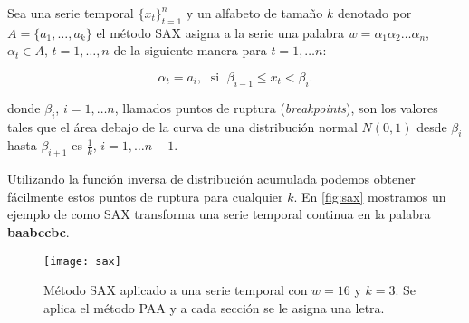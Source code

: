 \begin{definicion}[SAX]
  Sea una serie temporal $\{x_t\}_{t = 1}^n$ y un alfabeto de tamaño $k$ denotado por $A = \{a_1, \ldots, a_k\}$ el método SAX asigna a la serie una palabra $w = \alpha_1\alpha_2\ldots\alpha_n$, $\alpha_t \in A, \, t = 1, \ldots, n$ de la siguiente manera para $t = 1, \ldots n$:

  $$\alpha_t = a_i, \; \text{ si } \; \beta_{i-1} \leq x_t < \beta_i.$$

  donde $\beta_i$, $i = 1, \ldots n$, llamados puntos de ruptura (\emph{breakpoints}), son los valores tales que el área debajo de la curva de una distribución normal $N(0,1)$ desde $\beta_i$ hasta $\beta_{i+1}$ es $\frac{1}{k}$, $i = 1, \ldots n-1$.
  \label{def:sax}
\end{definicion}

Utilizando la función inversa de distribución acumulada podemos obtener fácilmente estos puntos de ruptura para cualquier $k$. En \autoref{fig:sax} \cite{lin2007experiencing} mostramos un ejemplo de como SAX transforma una serie temporal continua en la palabra \textbf{baabccbc}.

\begin{figure}[htpb]
  \centering
  \texttt{[image: sax]}
  \caption{Método SAX aplicado a una serie temporal con $w = 16$ y $k = 3$. Se aplica el método PAA y a cada sección se le asigna una letra.}
  \label{fig:sax}
\end{figure}

\endinput

